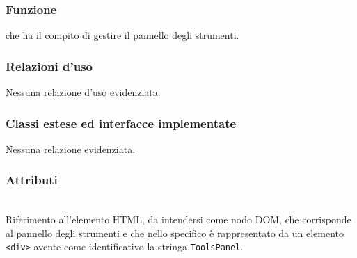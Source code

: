 
\subsubsection*{Funzione}
 che ha il compito di gestire il pannello degli strumenti.

\subsubsection*{Relazioni d'uso}
Nessuna relazione d'uso evidenziata.

\subsubsection*{Classi estese ed interfacce implementate}
Nessuna relazione evidenziata.

\subsubsection*{Attributi}
\begin{description}
\item{}\\
Riferimento all'elemento HTML, da intendersi come nodo DOM, che corrisponde al pannello degli strumenti e che nello specifico è rappresentato da un elemento \verb'<div>' avente come identificativo la stringa \verb'ToolsPanel'.
\end{description}

